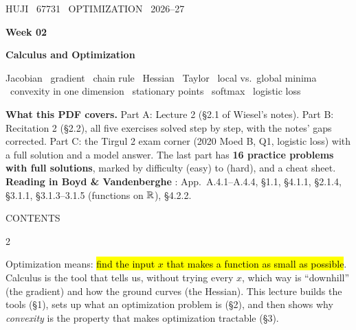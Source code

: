{\ttfamily\small\color{pgreen}HUJI \textperiodcentered\ 67731 \textperiodcentered\ OPTIMIZATION \textperiodcentered\ 2026--27}\par\vspace{6pt}
{\sffamily\bfseries\fontsize{30}{34}\selectfont\color{pgold}Week 02}\par\vspace{4pt}
{\sffamily\bfseries\Large\color{pgold}Calculus and Optimization}\par\vspace{4pt}
{\ttfamily\small\color{pcyan}Jacobian \textperiodcentered\ gradient \textperiodcentered\ chain rule \textperiodcentered\ Hessian \textperiodcentered\ Taylor \textperiodcentered\ local vs.\ global minima \textperiodcentered\ convexity in one dimension \textperiodcentered\ stationary points \textperiodcentered\ softmax \textperiodcentered\ logistic loss}\par
\vspace{0.6em}
\begin{plainbox}
\textbf{What this PDF covers.} Part A: Lecture 2 (\S2.1 of Wiesel's notes). Part B: Recitation 2 (\S2.2), all five exercises solved step by step, with the notes' gaps corrected.
Part C: the Tirgul 2 exam corner (2020 Moed B, Q1, logistic loss) with a full solution and a model answer. The last part has \textbf{16 practice problems with full solutions}, marked by difficulty \lvl{$\bullet\circ\circ$} (easy) to \lvl{$\bullet\bullet\bullet$} (hard),
and a cheat sheet.
\textbf{Reading in Boyd \& Vandenberghe} : App.~A.4.1--A.4.4, \S1.1, \S4.1.1, \S2.1.4, \S3.1.1, \S3.1.3--3.1.5 (functions on $\mathbb{R}$), \S4.2.2.
\end{plainbox}

{\ttfamily\small\color{pgreen}CONTENTS}
\begin{multicols}{2}\footnotesize\setlength{\parskip}{0pt}
\setcounter{tocdepth}{1}
\makeatletter{}\makeatother
\end{multicols}


Optimization means: \hl{find the input $x$ that makes a function as small as possible}. Calculus is the tool that tells us, without trying every $x$,
which way is ``downhill'' (the gradient) and how the ground curves (the Hessian). This lecture builds the tools (\S1), sets up what an
optimization problem is (\S2), and then shows why \emph{convexity} is the property that makes optimization tractable (\S3).

